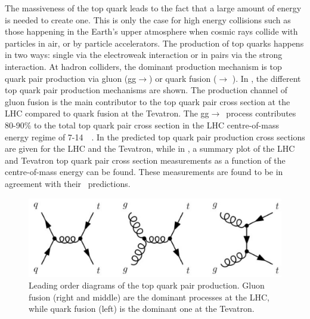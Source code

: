 The massiveness of the top quark leads to the fact that a large amount of energy is needed to create one. This is only the case for high energy collisions such as those happening in the Earth's upper atmosphere when cosmic rays collide with particles in air, or by particle accelerators. The production of top quarks happens in two ways: single via the electroweak interaction or in pairs via the strong interaction. At hadron colliders, the dominant production mechanism is top quark pair production via gluon (gg$\rightarrow$\ttbar) or quark fusion (\qqbar $\rightarrow$ \ttbar). In , the different top quark pair production mechanisms are shown. The production channel of gluon fusion is the main contributor to the top quark pair cross section at the LHC compared to quark fusion at the Tevatron. %
The gg$\rightarrow$\ttbar\ process contributes 80-90\% to the total top quark pair cross section in the LHC centre-of-mass energy regime of 7-14~\TeV~\cite{PDG}. In  the predicted top quark pair production cross sections are given for the LHC and the Tevatron, while in , a summary plot of the LHC and Tevatron top quark pair cross section measurements as a function of the centre-of-mass energy can be found. These measurements are found to be in agreement with their \SM\ predictions. 
\begin{figure}[htbp]
	\centering
	\includegraphics[width=0.7\linewidth]{1_Introduction/Figures/toppair}
	\caption{Leading order diagrams of the top quark pair production. Gluon fusion (right and middle) are the dominant processes at the LHC, while quark fusion (left) is the dominant one at the Tevatron. }
	\label{fig:toppairproduction}
\end{figure}
